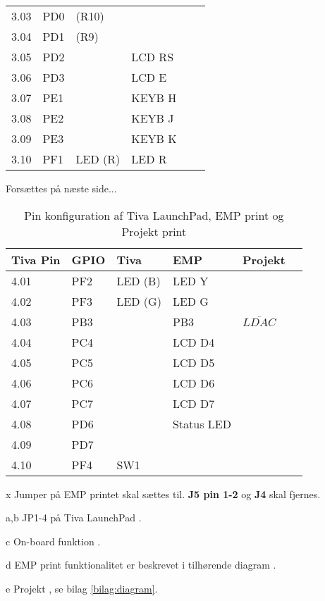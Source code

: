 \begin{table}[h!]
\begin{threeparttable}
\begin{tabular}{l l l l l l}
			3.03 & PD0	&(R10)	&				&								\\
			3.04 & PD1	&(R9)	&				&								\\
			3.05 & PD2	&		& LCD RS		& 				\\
			3.06 & PD3	&		& LCD E			& 						\\
			3.07 & PE1	&		& KEYB H		& 							\\
			3.08 & PE2	&		& KEYB J		&							\\
			3.09 & PE3	&		& KEYB K		&								\\
			3.10 & PF1	&LED (R)& LED R			&								\\
			\bottomrule
		\end{tabular}
	
		\begin{tablenotes}
			\item[] Forsættes på næste side...
		\end{tablenotes}
	\end{threeparttable}
\end{table}
\newpage
\begin{table}[ht]
	\centering
	\caption{Pin konfiguration af Tiva LaunchPad, EMP print og Projekt print}
	\begin{threeparttable}
		\begin{tabular}{l l l l l l}
			\toprule
			\textbf{Tiva Pin\tnote{a}} 	& 
			\textbf{GPIO\tnote{b}}  	&
			\textbf{Tiva\tnote{c}} 		& 
			\textbf{EMP\tnote{d}}  		&
			\textbf{Projekt\tnote{e}} 	\\ 
			\midrule
			4.01 & PF2	&LED (B)& LED Y			&								\\
			4.02 & PF3	&LED (G)& LED G			&								\\
			4.03 & PB3	&		& PB3			&	$\overline{LDAC}$							\\
			4.04 & PC4	&		& LCD D4		& 			\\
			4.05 & PC5	&		& LCD D5		& 				\\
			4.06 & PC6	&		& LCD D6		& 				\\
			4.07 & PC7	&		& LCD D7		& 				\\
			4.08 & PD6	&		& Status LED	& 		\\
			4.09 & PD7	&		& 				&								\\
			4.10 & PF4	& SW1	& 				&								\\
			\bottomrule
		\end{tabular}
		
		\begin{tablenotes}
			\item[x] Jumper på EMP printet skal sættes til. \textbf{J5 pin 1-2} og \textbf{J4} skal fjernes.
			\item[a,b] JP1-4 på Tiva LaunchPad \cite[Afsnit 2.1.5 s. 9]{spmu296}.
			\item[c] On-board funktion \cite[Afsnit 2.1.5 s. 9]{spmu296}.
			\item[d] EMP print funktionalitet er beskrevet i tilhørende diagram \cite{emp-diagram}.
			\item[e] Projekt , se bilag \ref{bilag:diagram}.
		\end{tablenotes}
	\end{threeparttable}
\end{table}